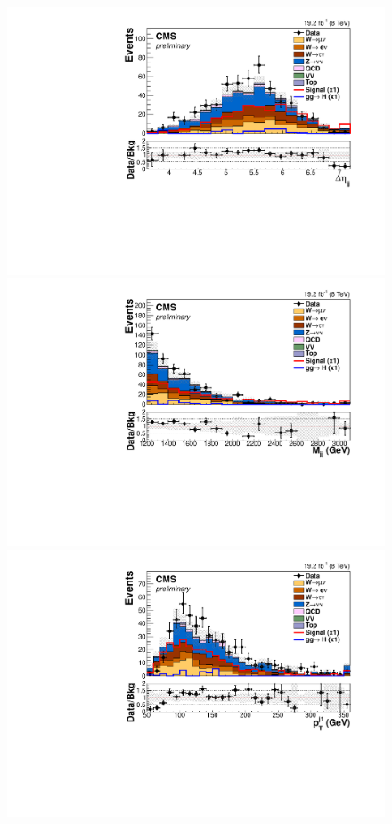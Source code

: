 \begin{figure}
    \includegraphics[width=.65\largefigwidth]{plots/parked/HIG-14-038-figs/output_sigreg/nunu_dijet_deta.pdf}
    \includegraphics[width=.65\largefigwidth]{plots/parked/HIG-14-038-figs/output_sigreg/nunu_dijet_M.pdf}
    \includegraphics[width=.65\largefigwidth]{plots/parked/HIG-14-038-figs/output_sigreg/nunu_jet1_pt.pdf}

\end{figure}
